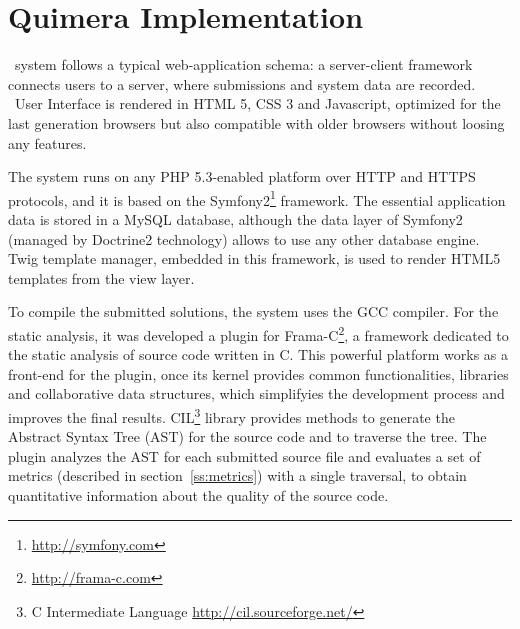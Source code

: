 \section{{Quimera Implementation}} \label{ss:tech}

\quim\ system follows a typical web-application schema: a server-client framework connects users to a server, where submissions and system data are recorded.
\quim\ User Interface is rendered in \textsf{HTML 5}, \textsf{CSS 3} and \textsf{Javascript}, optimized for the last generation browsers but also compatible with older browsers without loosing any features.

The system runs on any \textsf{PHP 5.3-enabled} platform over \textsf{HTTP} and \textsf{HTTPS} protocols, and it is based on the \textsf{Symfony2}\footnote{\url{http://symfony.com}} framework.
The essential application data is stored in a \textsf{MySQL} database, although the data layer of \textsf{Symfony2} (managed by \textsf{Doctrine2} technology) allows to use any other database engine.
\textsf{Twig} template manager, embedded in this framework, is used to render HTML5 templates from the view layer.

To compile the submitted solutions, the system uses the \textsf{GCC} compiler.
For the static analysis, it was developed a plugin for \textsf{Frama-C}\footnote{\url{http://frama-c.com}}, a framework dedicated to the static analysis of source code written in C.
This powerful platform works as a front-end for the plugin, once its kernel provides common functionalities, libraries and collaborative data structures, which simplifyies the development process and improves the final results.
\textsf{CIL}\footnote{C Intermediate Language \url{http://cil.sourceforge.net/}} library provides methods to  generate the \textsf{Abstract Syntax Tree (AST)} for the source code and to traverse the tree.
The plugin analyzes the AST for each submitted source file and evaluates a set of metrics (described in section~\ref{ss:metrics}) with a single traversal, to obtain quantitative information about the  quality of the  source code.


